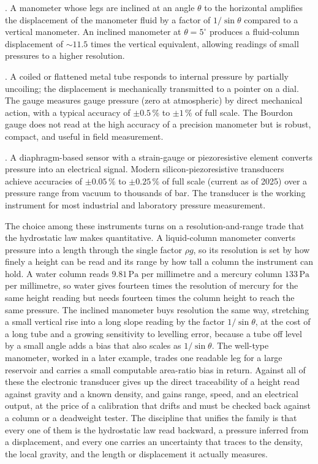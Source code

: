 . A manometer whose legs are
inclined at an angle $\theta$ to the horizontal amplifies the
displacement of the manometer fluid by a factor of $1/\sin\theta$
compared to a vertical manometer. An inclined manometer at $\theta
= 5^{\circ}$ produces a fluid-column displacement of $\sim 11.5$
times the vertical equivalent, allowing readings of small
pressures to a higher resolution.

. A coiled or flattened metal
tube responds to internal pressure by partially uncoiling; the
displacement is mechanically transmitted to a pointer on a dial.
The gauge measures gauge pressure (zero at atmospheric) by
direct mechanical action, with a typical accuracy of $\pm 0.5\,\%$
to $\pm 1\,\%$ of full scale. The Bourdon gauge does not read at
the high accuracy of a precision manometer but is robust,
compact, and useful in field measurement.

. A diaphragm-based
sensor with a strain-gauge or piezoresistive element converts
pressure into an electrical signal. Modern silicon-piezoresistive
transducers achieve accuracies of $\pm 0.05\,\%$ to $\pm 0.25\,\%$
of full scale (current as of 2025) over a pressure range from
vacuum to thousands of bar. The transducer is the working
instrument for most industrial and laboratory pressure
measurement.

The choice among these instruments turns on a resolution-and-range
trade that the hydrostatic law makes quantitative. A liquid-column
manometer converts pressure into a length through the single factor
$\rho g$, so its resolution is set by how finely a height can be read
and its range by how tall a column the instrument can hold. A water
column reads $9.81\,\text{Pa}$ per millimetre and a mercury column
$133\,\text{Pa}$ per millimetre, so water gives fourteen times the
resolution of mercury for the same height reading but needs fourteen
times the column height to reach the same pressure. The inclined
manometer buys resolution the same way, stretching a small vertical rise
into a long slope reading by the factor $1/\sin\theta$, at the cost of a
long tube and a growing sensitivity to levelling error, because a tube
off level by a small angle adds a bias that also scales as $1/\sin\theta$.
The well-type manometer, worked in a later example, trades one readable
leg for a large reservoir and carries a small computable area-ratio bias
in return. Against all of these the electronic transducer gives up the
direct traceability of a height read against gravity and a known density,
and gains range, speed, and an electrical output, at the price of a
calibration that drifts and must be checked back against a column or a
deadweight tester. The discipline that unifies the family is that every
one of them is the hydrostatic law read backward, a pressure inferred
from a displacement, and every one carries an uncertainty that traces to
the density, the local gravity, and the length or displacement it
actually measures.

